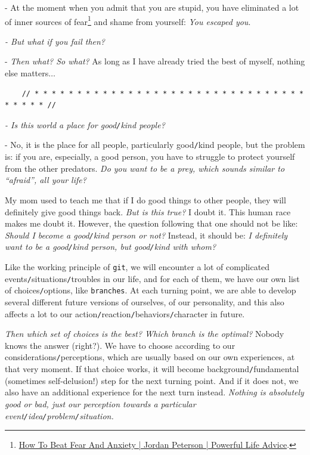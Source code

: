 \documentclass[12pt]{article}
\begin{document}
- At the moment when you admit that you are stupid, you have eliminated a lot of inner sources of fear\footnote{\href{https://www.youtube.com/watch?v=bb9g9mtDHZo}{How To Beat Fear And Anxiety | Jordan Peterson | Powerful Life Advice}.} and shame from yourself: {\it You escaped you}.

{\it - But what if you fail then?}

- {\it Then what? So what?} As long as I have already tried the best of myself, nothing else matters$\ldots$

\begin{verbatim}
	// * * * * * * * * * * * * * * * * * * * * * * * * * * * * * * * * * * * * * //
\end{verbatim}

\noindent
{} {\it - Is this world a place for good{\tt/}kind people?}

- No, it is the place for all people, particularly good{\tt/}kind people, but the problem is: if you are, especially, a good person, you have to struggle to protect yourself from the other predators. {\it Do you want to be a prey, which sounds similar to ``afraid'', all your life?} 

My mom used to teach me that if I do good things to other people, they will definitely give good things back. {\it But is this true?} I doubt it. This human race makes me doubt it. However, the question following that one should not be like: {\it Should I become a good{\tt/}kind person or not?} Instead, it should be: {\it I definitely want to be a good{\tt/}kind person, but good{\tt/}kind with whom?}

Like the working principle of \texttt{git}, we will encounter a lot of complicated events{\tt/}situations{\tt/}troubles in our life, and for each of them, we have our own list of choices{\tt/}options, like \texttt{branches}. At each turning point, we are able to develop several different future versions of ourselves, of our personality, and this also affects a lot to our action{\tt/}reaction{\tt/}behaviors{\tt/}character in future.

{\it Then which set of choices is the best? Which branch is the optimal?} Nobody knows the answer (right?). We have to choose according to our considerations{\tt/}perceptions, which are usually based on our own experiences, at that very moment. If that choice works, it will become background{\tt/}fundamental (sometimes self-delusion!) step for the next turning point. And if it does not, we also have an additional experience for the next turn instead. {\it Nothing is absolutely good or bad, just our perception towards a particular event{\tt/}idea{\tt/}problem{\tt/}situation.}
\end{document}
